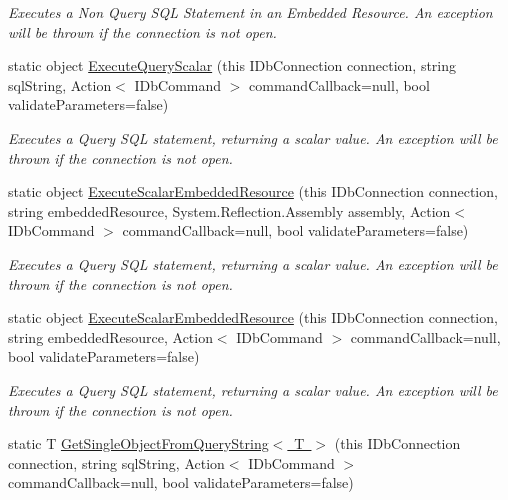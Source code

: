 \begin{DoxyCompactItemize}
\begin{DoxyCompactList}\small\item\em Executes a Non Query S\+QL Statement in an Embedded Resource. An exception will be thrown if the connection is not open. \end{DoxyCompactList}\item 
static object \mbox{\hyperlink{class_blue_cloud_1_1_extensions_1_1_data_1_1_i_db_connection_extensions_ae18988406fddb5b1d39db4d364f258b5}{Execute\+Query\+Scalar}} (this I\+Db\+Connection connection, string sql\+String, Action$<$ I\+Db\+Command $>$ command\+Callback=null, bool validate\+Parameters=false)
\begin{DoxyCompactList}\small\item\em Executes a Query S\+QL statement, returning a scalar value. An exception will be thrown if the connection is not open. \end{DoxyCompactList}\item 
static object \mbox{\hyperlink{class_blue_cloud_1_1_extensions_1_1_data_1_1_i_db_connection_extensions_adc070329fd92b0fa1e2c928671147e0f}{Execute\+Scalar\+Embedded\+Resource}} (this I\+Db\+Connection connection, string embedded\+Resource, System.\+Reflection.\+Assembly assembly, Action$<$ I\+Db\+Command $>$ command\+Callback=null, bool validate\+Parameters=false)
\begin{DoxyCompactList}\small\item\em Executes a Query S\+QL statement, returning a scalar value. An exception will be thrown if the connection is not open. \end{DoxyCompactList}\item 
static object \mbox{\hyperlink{class_blue_cloud_1_1_extensions_1_1_data_1_1_i_db_connection_extensions_ad7fb52092d3f2bd4fa11d0da0bffd576}{Execute\+Scalar\+Embedded\+Resource}} (this I\+Db\+Connection connection, string embedded\+Resource, Action$<$ I\+Db\+Command $>$ command\+Callback=null, bool validate\+Parameters=false)
\begin{DoxyCompactList}\small\item\em Executes a Query S\+QL statement, returning a scalar value. An exception will be thrown if the connection is not open. \end{DoxyCompactList}\item 
static T \mbox{\hyperlink{class_blue_cloud_1_1_extensions_1_1_data_1_1_i_db_connection_extensions_a9e64ad9f06cca43d119fc75364dcba7f}{Get\+Single\+Object\+From\+Query\+String$<$ T $>$}} (this I\+Db\+Connection connection, string sql\+String, Action$<$ I\+Db\+Command $>$ command\+Callback=null, bool validate\+Parameters=false)

\end{DoxyCompactItemize}
